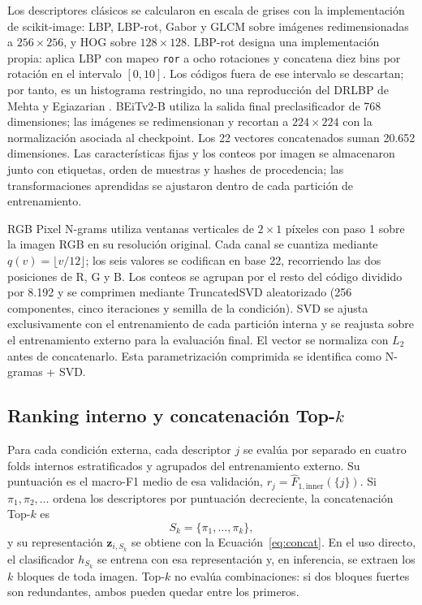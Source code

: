 \documentclass[a4paper,fleqn]{cas-sc}
\begin{document}
Los descriptores clásicos se calcularon en escala de grises con la implementación de scikit-image: LBP, LBP-rot, Gabor y GLCM sobre imágenes redimensionadas a $256\times256$, y HOG sobre $128\times128$. LBP-rot designa una implementación propia: aplica LBP con mapeo \texttt{ror} a ocho rotaciones y concatena diez bins por rotación en el intervalo $[0,10]$. Los códigos fuera de ese intervalo se descartan; por tanto, es un histograma restringido, no una reproducción del DRLBP de Mehta y Egiazarian \citep{mehta2016drlbp}. BEiTv2-B utiliza la salida final preclasificador de 768 dimensiones; las imágenes se redimensionan y recortan a $224\times224$ con la normalización asociada al checkpoint. Los 22 vectores concatenados suman 20.652 dimensiones. Las características fijas y los conteos por imagen se almacenaron junto con etiquetas, orden de muestras y hashes de procedencia; las transformaciones aprendidas se ajustaron dentro de cada partición de entrenamiento.

RGB Pixel N-grams \citep{paiva2023rgb} utiliza ventanas verticales de $2\times1$ píxeles con paso 1 sobre la imagen RGB en su resolución original. Cada canal se cuantiza mediante $q(v)=\lfloor v/12\rfloor$; los seis valores se codifican en base 22, recorriendo las dos posiciones de R, G y B. Los conteos se agrupan por el resto del código dividido por 8.192 y se comprimen mediante TruncatedSVD aleatorizado (256 componentes, cinco iteraciones y semilla de la condición). SVD se ajusta exclusivamente con el entrenamiento de cada partición interna y se reajusta sobre el entrenamiento externo para la evaluación final. El vector se normaliza con $L_2$ antes de concatenarlo. Esta parametrización comprimida se identifica como N-gramas + SVD.

\subsection{Ranking interno y concatenación Top-$k$}\label{sec:topk}

Para cada condición externa, cada descriptor $j$ se evalúa por separado en cuatro folds internos estratificados y agrupados del entrenamiento externo. Su puntuación es el macro-F1 medio de esa validación, $r_j=\widehat{F}_{1,\mathrm{inner}}(\{j\})$. Si $\pi_1,\pi_2,\ldots$ ordena los descriptores por puntuación decreciente, la concatenación Top-$k$ es
\begin{equation}
 S_k=\{\pi_1,\ldots,\pi_k\},
 \label{eq:topk}
\end{equation}
y su representación $\mathbf{z}_{i,S_k}$ se obtiene con la Ecuación~\eqref{eq:concat}. En el uso directo, el clasificador $h_{S_k}$ se entrena con esa representación y, en inferencia, se extraen los $k$ bloques de toda imagen. Top-$k$ no evalúa combinaciones: si dos bloques fuertes son redundantes, ambos pueden quedar entre los primeros.
\end{document}
